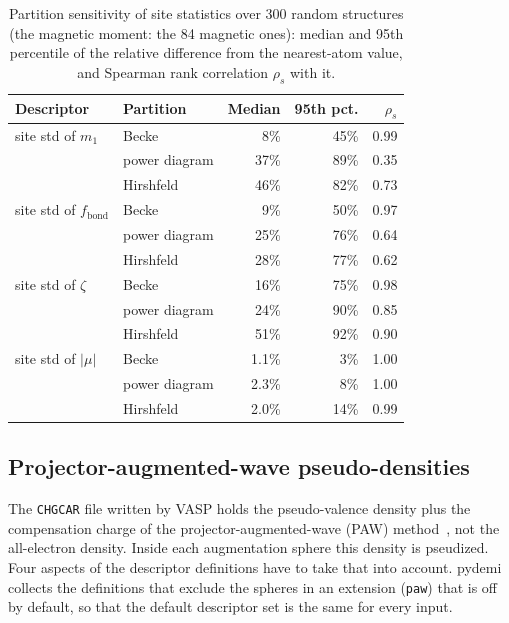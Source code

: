 \documentclass[11pt,a4paper]{article}
\begin{document}
\begin{table}[htbp]
\centering
\caption{Partition sensitivity of site statistics over 300 random structures
(the magnetic moment: the 84 magnetic ones): median and 95th percentile of the
relative difference from the nearest-atom value, and Spearman rank correlation
$\rho_s$ with it.}
\label{tab:partition-sensitivity}
\begin{tabular}{llrrr}
\toprule
Descriptor & Partition & Median & 95th pct. & $\rho_s$ \\
\midrule
site std of $m_1$ & Becke & 8\% & 45\% & 0.99 \\
 & power diagram & 37\% & 89\% & 0.35 \\
 & Hirshfeld & 46\% & 82\% & 0.73 \\
site std of $f_{\mathrm{bond}}$ & Becke & 9\% & 50\% & 0.97 \\
 & power diagram & 25\% & 76\% & 0.64 \\
 & Hirshfeld & 28\% & 77\% & 0.62 \\
site std of $\zeta$ & Becke & 16\% & 75\% & 0.98 \\
 & power diagram & 24\% & 90\% & 0.85 \\
 & Hirshfeld & 51\% & 92\% & 0.90 \\
site std of $|\mu|$ & Becke & 1.1\% & 3\% & 1.00 \\
 & power diagram & 2.3\% & 8\% & 1.00 \\
 & Hirshfeld & 2.0\% & 14\% & 0.99 \\
\bottomrule
\end{tabular}
\end{table}

\subsection{Projector-augmented-wave pseudo-densities}
\label{sec:numerics:paw}

The \texttt{CHGCAR} file written by VASP holds the pseudo-valence density plus
the compensation charge of the projector-augmented-wave (PAW)
method~\cite{blochl1994,kresse1999}, not the all-electron density. Inside each
augmentation sphere this density is pseudized. Four aspects of the descriptor
definitions have to take that into account. pydemi collects the definitions
that exclude the spheres in an extension (\texttt{paw}) that is off by
default, so that the default descriptor set is the same for every input.
\end{document}
